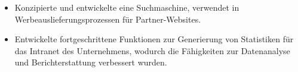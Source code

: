 \begin{minipage}{\linewidth}
\begin{itemize}
\item Konzipierte und entwickelte eine Suchmaschine, verwendet in Werbeauslieferungsprozessen für Partner-Websites.
\item Entwickelte fortgeschrittene Funktionen zur Generierung von Statistiken für das Intranet des Unternehmens, wodurch die Fähigkeiten zur Datenanalyse und Berichterstattung verbessert wurden.
\end{itemize}
\end{minipage}
\divider
